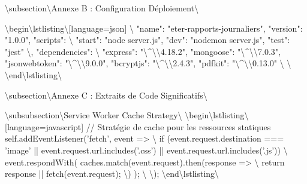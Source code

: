 \documentclass[12pt,a4paper]{report}
\begin{document}
\textbackslash{}subsection\textbackslash{}{Annexe B : Configuration Déploiement\textbackslash{}}

\textbackslash{}begin\textbackslash{}{lstlisting\textbackslash{}}[language=json]
\textbackslash{}{
  "name": "eter-rapports-journaliers",
  "version": "1.0.0",
  "scripts": \textbackslash{}{
    "start": "node server.js",
    "dev": "nodemon server.js",
    "test": "jest"
  \textbackslash{}},
  "dependencies": \textbackslash{}{
    "express": "\textbackslash{}^\textbackslash{}{\textbackslash{}}4.18.2",
    "mongoose": "\textbackslash{}^\textbackslash{}{\textbackslash{}}7.0.3",
    "jsonwebtoken": "\textbackslash{}^\textbackslash{}{\textbackslash{}}9.0.0",
    "bcryptjs": "\textbackslash{}^\textbackslash{}{\textbackslash{}}2.4.3",
    "pdfkit": "\textbackslash{}^\textbackslash{}{\textbackslash{}}0.13.0"
  \textbackslash{}}
\textbackslash{}}
\textbackslash{}end\textbackslash{}{lstlisting\textbackslash{}}

\textbackslash{}subsection\textbackslash{}{Annexe C : Extraits de Code Significatifs\textbackslash{}}

\textbackslash{}subsubsection\textbackslash{}{Service Worker Cache Strategy\textbackslash{}}
\textbackslash{}begin\textbackslash{}{lstlisting\textbackslash{}}[language=javascript]
// Stratégie de cache pour les ressources statiques
self.addEventListener('fetch', event => \textbackslash{}{
    if (event.request.destination === 'image' || 
        event.request.url.includes('.css') || 
        event.request.url.includes('.js')) \textbackslash{}{
        event.respondWith(
            caches.match(event.request).then(response => \textbackslash{}{
                return response || fetch(event.request);
            \textbackslash{}})
        );
    \textbackslash{}}
\textbackslash{}});
\textbackslash{}end\textbackslash{}{lstlisting\textbackslash{}}
\end{document}
